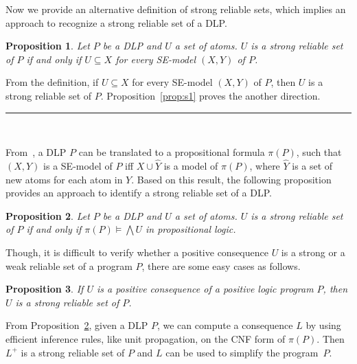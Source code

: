 \documentclass{article}
\newtheorem{proposition}{Proposition}
\newenvironment{proofs}{{\bf Proof Sketch:}}{\rule{2mm}{2mm}\\[-.5em] }
\begin{document}
Now we provide an alternative definition of strong reliable sets, which implies an approach to recognize a strong reliable set of a DLP.
\begin{proposition}
  Let $P$ be a DLP and $U$ a set of atoms. $U$ is a strong reliable set of $P$ if and only if $U\subseteq X$ for every SE-model $(X, Y)$ of $P$.
\end{proposition}
\begin{proofs}
  From the definition, if $U\subseteq X$ for every SE-model $(X, Y)$ of $P$, then $U$ is a strong reliable set of $P$.
  Proposition~\ref{prop:s1} proves the another direction.
\end{proofs}

From~\cite{pearce2001encodings}, a DLP $P$ can be translated to a propositional formula $\pi(P)$, such that $(X, Y)$ is a SE-model of $P$ if{f} $X\cup\hat{Y}$ is a model of $\pi(P)$, where $\hat{Y}$ is a set of new atoms for each atom in $Y$.
Based on this result, the following proposition provides an approach to identify a strong reliable set of a DLP.

\begin{proposition}\label{prop:new}
  Let $P$ be a DLP and $U$ a set of atoms. $U$ is a strong reliable set of $P$ if and only if $\pi(P) \models \bigwedge U$ in propositional logic.
\end{proposition}


Though, it is difficult to verify whether a positive consequence $U$ is a strong or a weak reliable set of a program $P$, there are some easy cases as follows.

\begin{proposition}
  If $U$ is a positive consequence of a positive logic program $P$, then $U$ is a strong reliable set of $P$.
\end{proposition}

From Proposition~\ref{prop:new}, given a DLP $P$, we can compute a consequence $L$ by using efficient inference rules, like unit propagation, on the CNF form of $\pi(P)$. Then $L^+$ is a strong reliable set of $P$ and $L$ can be used to simplify the program~$P$.


\end{document}
